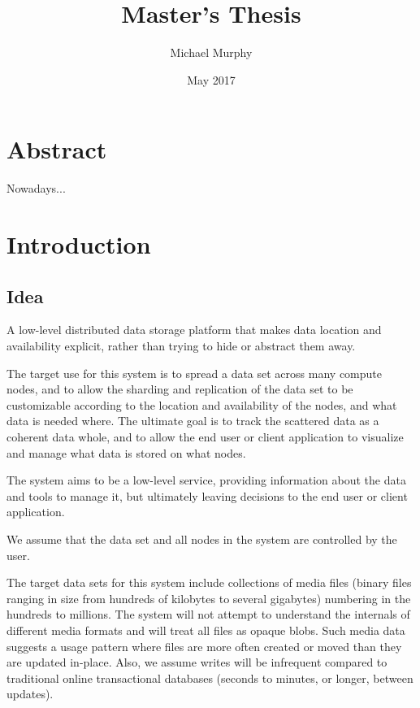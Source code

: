 \documentclass[12pt,a4paper,two-side]{book}
\begin{document}
\title{Master's Thesis}
\author{Michael Murphy}
\date{May 2017}
\maketitle

\frontmatter

\chapter{Abstract}
  Nowadays...

\tableofcontents

{}

\listoffigures
{}

\listoftables
{}

\lstlistoflistings
{}

\mainmatter

\chapter{Introduction}

\section{Idea}\label{idea}

A low-level distributed data storage platform that makes data location and
availability explicit, rather than trying to hide or abstract them away.

The target use for this system is to spread a data set across many compute
nodes, and to allow the sharding and replication of the data set to be
customizable according to the location and availability of the nodes, and what
data is needed where. The ultimate goal is to track the scattered data as a
coherent data whole, and to allow the end user or client application to
visualize and manage what data is stored on what nodes.

The system aims to be a low-level service, providing information about the data
and tools to manage it, but ultimately leaving decisions to the end user or
client application.

We assume that the data set and all nodes in the system are controlled by the
user.

The target data sets for this system include collections of media files (binary
files ranging in size from hundreds of kilobytes to several gigabytes) numbering
in the hundreds to millions. The system will not attempt to understand the
internals of different media formats and will treat all files as opaque blobs.
Such media data suggests a usage pattern where files are more often created or
moved than they are updated in-place. Also, we assume writes will be infrequent
compared to traditional online transactional databases (seconds to minutes, or
longer, between updates).
\end{document}

